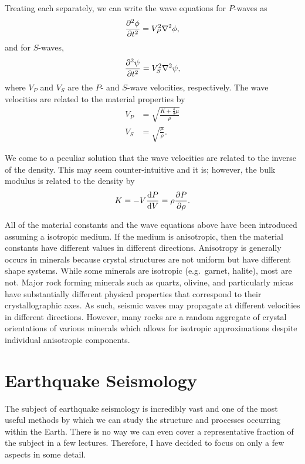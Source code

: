 Treating each separately, we can write the wave equations for $P$-waves as
\begin{equation}
    \pdv[2]{\phi}{t} = V_P^2 \nabla^2 \phi,
\end{equation}
and for $S$-waves,
\begin{equation}
    \pdv[2]{\vb{\psi}}{t} = V_S^2 \nabla^2 \vb{\psi},
\end{equation}
where $V_P$ and $V_S$ are the $P$- and $S$-wave velocities, respectively.
The wave velocities are related to the material properties by
\begin{align}
    V_P & = \sqrt{\frac{K + \frac{4}{3} \mu}{\rho}} \\
    V_S & = \sqrt{\frac{\mu}{\rho}}.
\end{align}

We come to a peculiar solution that the wave velocities are related to the inverse of the density.  This may seem counter-intuitive and it is; however, the bulk modulus is related to the density by
\begin{equation}
    K = -V \dv{P}{V} = \rho \pdv{P}{\rho}.
\end{equation}

All of the material constants and the wave equations above have been introduced assuming a isotropic medium.  If the medium is anisotropic, then the material constants have different values in different directions.  Anisotropy is generally occurs in minerals because crystal structures are not uniform but have different shape systems.  While some minerals are isotropic (e.g.\ garnet, halite), most are not.  Major rock forming minerals such as quartz, olivine, and particularly micas have substantially different physical properties that correspond to their crystallographic axes.  As such, seismic waves may propagate at different velocities in different directions.  However, many rocks are a random aggregate of crystal orientations of various minerals which allows for isotropic approximations despite individual anisotropic components.

\section{Earthquake Seismology}
The subject of earthquake seismology is incredibly vast and one of the most useful methods by which we can study the structure and processes occurring within the Earth.  There is no way we can even cover a representative fraction of the subject in a few lectures.  Therefore, I have decided to focus on only a few aspects in some detail.  

